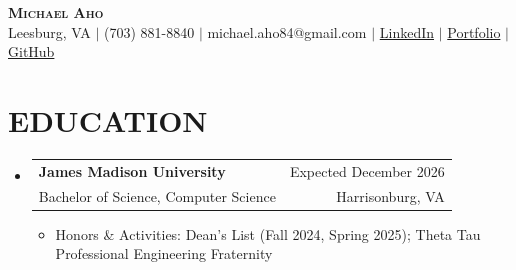 \documentclass[letterpaper,11pt]{article}
\makeatletter
\newcommand{\resumeItem}[1]{
  \item\small{
    {#1 \vspace{-2pt}}
  }
}
\newcommand{\resumeSubheading}[4]{
  \vspace{-2pt}\item
    \begin{tabular*}{1\textwidth}[t]{l@{\extracolsep{\fill}}r}
      \textbf{#1} & #2 \\
      {\small#3} & {\small #4} \\
    \end{tabular*}\vspace{-7pt}
}
\newcommand{\resumeSubHeadingListStart}{\begin{itemize}[leftmargin=0in, label={}]}
\newcommand{\resumeSubHeadingListEnd}{\end{itemize}}
\newcommand{\resumeItemListStart}{\begin{itemize}}
\newcommand{\resumeItemListEnd}{\end{itemize}\vspace{-4pt}}
\makeatother
\begin{document}
\begin{center}
    \textbf{\Huge  \scshape Michael Aho} \\ \vspace{3pt}
    \normalsize Leesburg, VA $|$ (703) 881-8840 $|$ michael.aho84@gmail.com $|$ 
    \href{https://www.linkedin.com/in/michael-a-aho/}{LinkedIn} $|$
    \href{https://michaelaho1.github.io/Portfolio/}{Portfolio} $|$
    \href{https://github.com/MichaelAho1}{GitHub}
\end{center}
\vspace{-12pt}

\section{EDUCATION}
  \resumeSubHeadingListStart
    \resumeSubheading
      {James Madison University}{Expected December 2026}
      {Bachelor of Science, Computer Science}{Harrisonburg, VA}
      \resumeItemListStart
            \resumeItem{Honors \& Activities: Dean's List (Fall 2024, Spring 2025); Theta Tau Professional Engineering Fraternity}
      \resumeItemListEnd
  \resumeSubHeadingListEnd

\end{document}
